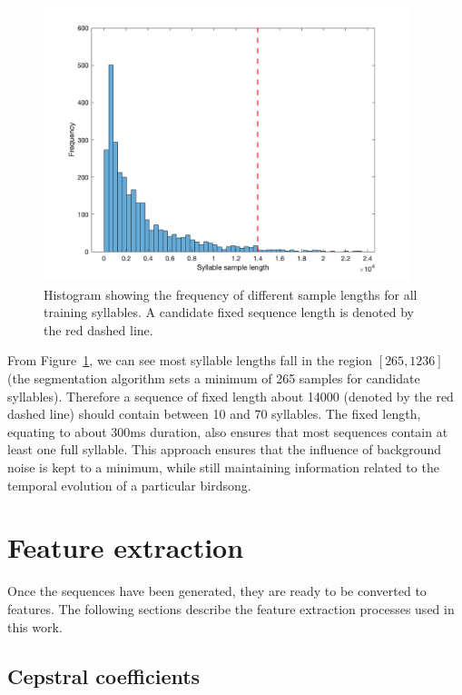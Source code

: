 \begin{figure}[ht]
  \centering
  \includegraphics[width=0.95\textwidth]{figures/syllable_sample_length.png}
  \caption{Histogram showing the frequency of different sample lengths for all
  training syllables. A candidate fixed sequence length is denoted by the red
dashed line.}\label{fig:syllable_sample_lengths}
\end{figure}

From Figure~\ref{fig:syllable_sample_lengths}, we can see most syllable lengths
fall in the region $\left[ 265, 1236 \right]$ (the segmentation algorithm sets a
minimum of 265 samples for candidate syllables). Therefore a sequence of fixed
length about 14000 (denoted by the red dashed line) should contain between 10
and 70 syllables. The fixed length, equating to about 300ms duration, also
ensures that most sequences contain at least one full syllable. This approach
ensures that the influence of background noise is kept to a minimum, while still
maintaining information related to the temporal evolution of a particular
birdsong.

\section{Feature extraction}\label{sec:method:feat_extraction}

Once the sequences have been generated, they are ready to be converted to
features. The following sections describe the feature extraction processes used
in this work.

\subsection{Cepstral coefficients}

